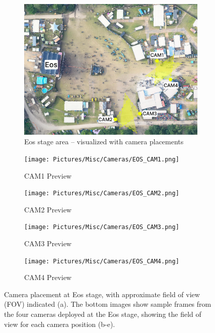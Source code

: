 \begin{figure}[htb!]
  \centering
  \begin{subfigure}{0.9\textwidth}
    \centering
    \includegraphics[width=\textwidth]{Pictures/Figures/eos_cameras.png}
    \caption{Eos stage area -- visualized with camera placements}
  \end{subfigure}
  \begin{subfigure}{0.42\textwidth}
    \centering
    \texttt{[image: Pictures/Misc/Cameras/EOS\_CAM1.png]}
    \caption{CAM1 Preview}
  \end{subfigure}%
  \hspace{0.06\textwidth}
  \begin{subfigure}{0.42\textwidth}
    \centering
    \texttt{[image: Pictures/Misc/Cameras/EOS\_CAM2.png]}
    \caption{CAM2 Preview}
  \end{subfigure}

  \begin{subfigure}{0.42\textwidth}
    \centering
    \texttt{[image: Pictures/Misc/Cameras/EOS\_CAM3.png]}
    \caption{CAM3 Preview}
  \end{subfigure}%
  \hspace{0.06\textwidth}
  \begin{subfigure}{0.42\textwidth}
    \centering
    \texttt{[image: Pictures/Misc/Cameras/EOS\_CAM4.png]}
    \caption{CAM4 Preview}
  \end{subfigure}

  \caption{Camera placement at Eos stage, with approximate field of view (FOV) indicated (a). The bottom images show sample frames from the four cameras deployed at the Eos stage, showing the field of view for each camera position (b-e).}
  \label{fig:eos_cameras}

\end{figure}


